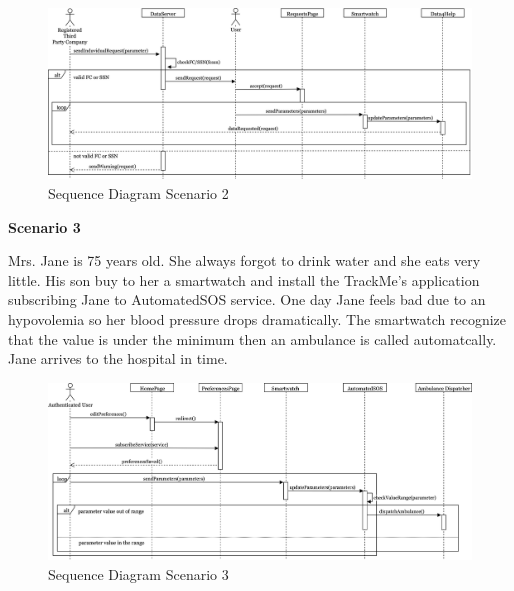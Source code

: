 \documentclass[../main.tex]{subfiles}
\begin{document}
		\begin{figure}[H]
			\centering
			\includegraphics[scale=.05]{images/sequenceDiagram2.png}
			\caption{Sequence Diagram Scenario 2 \label{fig:Sequence Diagram Scenario 2}}
		\end{figure}
		\begin{minipage}{\textwidth}

		\end{minipage}
		\begin{minipage}[t]{\textwidth}
			{\bf Scenario 3}
			\vspace{3mm}

			Mrs. Jane is 75 years old. She always forgot to drink water and she eats very little. His son buy to her a smartwatch and install the TrackMe's application subscribing Jane to AutomatedSOS service. One day Jane feels bad due to an hypovolemia so her blood pressure drops dramatically. The smartwatch recognize that the value is under the minimum then an ambulance is called automatcally. Jane arrives to the hospital in time.

			\vspace{5mm}
		\end{minipage}
		\begin{figure}[H]
			\centering
			\includegraphics[scale=.05]{images/sequenceDiagram3.png}
			\caption{Sequence Diagram Scenario 3 \label{fig:Sequence Diagram Scenario 3}}
		\end{figure}
		\begin{minipage}{\textwidth}

		\end{minipage}
\end{document}
